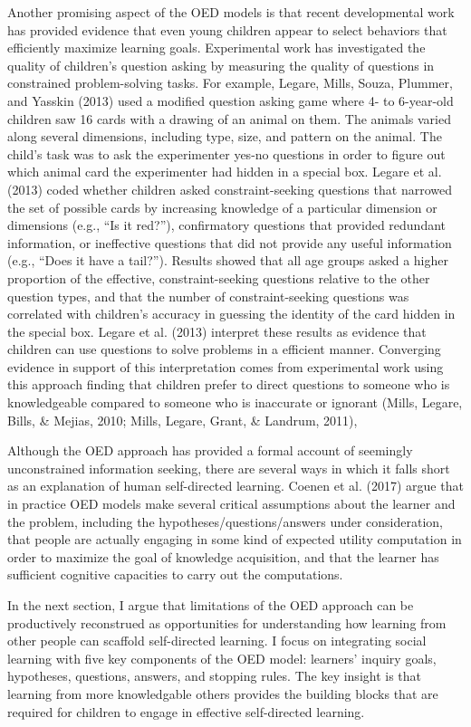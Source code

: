 \documentclass[english,man]{apa6}
\theoremstyle{definition}
\theoremstyle{definition}
\theoremstyle{definition}
\theoremstyle{remark}
\begin{document}
Another promising aspect of the OED models is that recent developmental
work has provided evidence that even young children appear to select
behaviors that efficiently maximize learning goals. Experimental work
has investigated the quality of children's question asking by measuring
the quality of questions in constrained problem-solving tasks. For
example, Legare, Mills, Souza, Plummer, and Yasskin (2013) used a
modified question asking game where 4- to 6-year-old children saw 16
cards with a drawing of an animal on them. The animals varied along
several dimensions, including type, size, and pattern on the animal. The
child's task was to ask the experimenter yes-no questions in order to
figure out which animal card the experimenter had hidden in a special
box. Legare et al. (2013) coded whether children asked
constraint-seeking questions that narrowed the set of possible cards by
increasing knowledge of a particular dimension or dimensions (e.g.,
\enquote{Is it red?}), confirmatory questions that provided redundant
information, or ineffective questions that did not provide any useful
information (e.g., \enquote{Does it have a tail?}). Results showed that
all age groups asked a higher proportion of the effective,
constraint-seeking questions relative to the other question types, and
that the number of constraint-seeking questions was correlated with
children's accuracy in guessing the identity of the card hidden in the
special box. Legare et al. (2013) interpret these results as evidence
that children can use questions to solve problems in a efficient manner.
Converging evidence in support of this interpretation comes from
experimental work using this approach finding that children prefer to
direct questions to someone who is knowledgeable compared to someone who
is inaccurate or ignorant (Mills, Legare, Bills, \& Mejias, 2010; Mills,
Legare, Grant, \& Landrum, 2011),

Although the OED approach has provided a formal account of seemingly
unconstrained information seeking, there are several ways in which it
falls short as an explanation of human self-directed learning. Coenen et
al. (2017) argue that in practice OED models make several critical
assumptions about the learner and the problem, including the
hypotheses/questions/answers under consideration, that people are
actually engaging in some kind of expected utility computation in order
to maximize the goal of knowledge acquisition, and that the learner has
sufficient cognitive capacities to carry out the computations.

In the next section, I argue that limitations of the OED approach can be
productively reconstrued as opportunities for understanding how learning
from other people can scaffold self-directed learning. I focus on
integrating social learning with five key components of the OED model:
learners' inquiry goals, hypotheses, questions, answers, and stopping
rules. The key insight is that learning from more knowledgable others
provides the building blocks that are required for children to engage in
effective self-directed learning.
\end{document}
